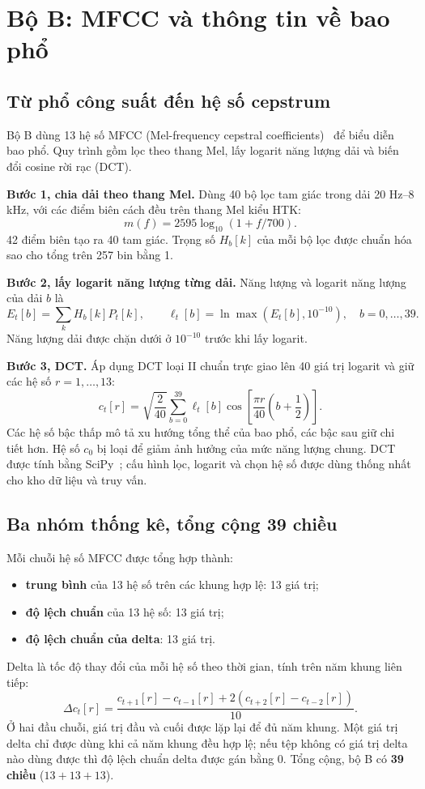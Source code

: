 \documentclass[11pt,a4paper]{article}
\begin{document}
\section{Bộ B: MFCC và thông tin về bao phổ}\label{sec:boB}
\subsection{Từ phổ công suất đến hệ số cepstrum}
Bộ B dùng 13 hệ số MFCC (Mel-frequency cepstral coefficients)~\cite{mfcc} để biểu diễn bao phổ. Quy trình gồm lọc theo thang Mel, lấy logarit năng lượng dải và biến đổi cosine rời rạc (DCT).

\textbf{Bước 1, chia dải theo thang Mel.} Dùng 40 bộ lọc tam giác trong dải 20 Hz--8 kHz, với các điểm biên cách đều trên thang Mel kiểu HTK:
\[
m(f)=2595\log_{10}(1+f/700).
\]
42 điểm biên tạo ra 40 tam giác. Trọng số $H_b[k]$ của mỗi bộ lọc được chuẩn hóa sao cho tổng trên 257 bin bằng 1.

\textbf{Bước 2, lấy logarit năng lượng từng dải.} Năng lượng và logarit năng lượng của dải $b$ là
\[
E_t[b]=\sum_k H_b[k]P_t[k],\qquad \ell_t[b]=\ln\max(E_t[b],10^{-10}),\quad b=0,\ldots,39.
\]
Năng lượng dải được chặn dưới ở $10^{-10}$ trước khi lấy logarit.

\textbf{Bước 3, DCT.} Áp dụng DCT loại II chuẩn trực giao lên 40 giá trị logarit và giữ các hệ số $r=1,\ldots,13$:
\[
c_t[r]=\sqrt{\frac{2}{40}}\sum_{b=0}^{39}\ell_t[b]\cos\left[\frac{\pi r}{40}\left(b+\frac12\right)\right].
\]
Các hệ số bậc thấp mô tả xu hướng tổng thể của bao phổ, các bậc sau giữ chi tiết hơn. Hệ số $c_0$ bị loại để giảm ảnh hưởng của mức năng lượng chung. DCT được tính bằng SciPy~\cite{dct}; cấu hình lọc, logarit và chọn hệ số được dùng thống nhất cho kho dữ liệu và truy vấn.

\subsection{Ba nhóm thống kê, tổng cộng 39 chiều}
Mỗi chuỗi hệ số MFCC được tổng hợp thành:
\begin{itemize}
\item \textbf{trung bình} của 13 hệ số trên các khung hợp lệ: 13 giá trị;
\item \textbf{độ lệch chuẩn} của 13 hệ số: 13 giá trị;
\item \textbf{độ lệch chuẩn của delta}: 13 giá trị.
\end{itemize}
Delta là tốc độ thay đổi của mỗi hệ số theo thời gian, tính trên năm khung liên tiếp:
\[
\Delta c_t[r]=\frac{c_{t+1}[r]-c_{t-1}[r]+2(c_{t+2}[r]-c_{t-2}[r])}{10}.
\]
Ở hai đầu chuỗi, giá trị đầu và cuối được lặp lại để đủ năm khung. Một giá trị delta chỉ được dùng khi cả năm khung đều hợp lệ; nếu tệp không có giá trị delta nào dùng được thì độ lệch chuẩn delta được gán bằng 0. Tổng cộng, bộ B có \textbf{39 chiều} ($13+13+13$).
\end{document}
